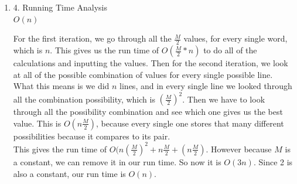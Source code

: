 \documentclass[11pt]{article}
\newenvironment{qparts}{\begin{enumerate}[{(}a{)}]}{\end{enumerate}}
\begin{document}
\begin{qparts}
Now that we have recorded all the different possibilities manually, and it's ending position for that specific cost. We can iterate through the record, and pull out the smallest value of cost that ends on the $word_n$. That should give us the smallest cost. 

\item[4.] Running Time Analysis \\
$O(n)$

For the first iteration, we go through all the $\frac{M}{2}$ values, for every single word, which is $n$. This gives us the run time of $O(\frac{M}{2} * n)$ to do all of the calculations and inputting the values. Then for the second iteration, we look at all of the possible combination of values for every single possible line. What this means is we did $n$ lines, and in every single line we looked through all the combination possibility, which is $(\frac{M}{2})^2$. Then we have to look through all the possibility combination and see which one gives us the best value. This is $O(n\frac{M}{2})$, because every single one stores that many different possibilities because it compares to its pair. \\

This gives the run time of $O(n(\frac{M}{2})^2 + n\frac{M}{2} + (n\frac{M}{2})$. However because $M$ is a constant, we can remove it in our run time. So now it is $O(3n)$. Since 2 is also a constant, our run time is $O(n)$. 
\end{qparts}


\newpage
\end{document}
